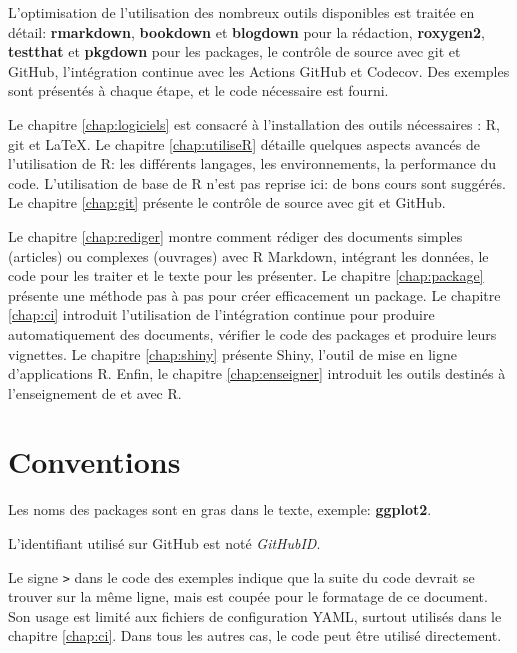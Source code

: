 \documentclass[
  12pt,
  french,
  a4paper,
  extrafontsizes,onecolumn,openright
  ]{memoir}
\newlength{\rf}
\begin{document}
L'optimisation de l'utilisation des nombreux outils disponibles est traitée en détail: \textbf{rmarkdown}, \textbf{bookdown} et \textbf{blogdown} pour la rédaction, \textbf{roxygen2}, \textbf{testthat} et \textbf{pkgdown} pour les packages, le contrôle de source avec git et GitHub, l'intégration continue avec les Actions GitHub et Codecov.
Des exemples sont présentés à chaque étape, et le code nécessaire est fourni.

Le chapitre \ref{chap:logiciels} est consacré à l'installation des outils nécessaires : R, git et LaTeX.
Le chapitre \ref{chap:utiliseR} détaille quelques aspects avancés de l'utilisation de R: les différents langages, les environnements, la performance du code.
L'utilisation de base de R n'est pas reprise ici: de bons cours sont suggérés.
Le chapitre \ref{chap:git} présente le contrôle de source avec git et GitHub.

Le chapitre \ref{chap:rediger} montre comment rédiger des documents simples (articles) ou complexes (ouvrages) avec R Markdown, intégrant les données, le code pour les traiter et le texte pour les présenter.
Le chapitre \ref{chap:package} présente une méthode pas à pas pour créer efficacement un package.
Le chapitre \ref{chap:ci} introduit l'utilisation de l'intégration continue pour produire automatiquement des documents, vérifier le code des packages et produire leurs vignettes.
Le chapitre \ref{chap:shiny} présente Shiny, l'outil de mise en ligne d'applications R.
Enfin, le chapitre \ref{chap:enseigner} introduit les outils destinés à l'enseignement de et avec R.

\hypertarget{conventions}{%
\section*{Conventions}\label{conventions}}

Les noms des packages sont en gras dans le texte, exemple: \textbf{ggplot2}.

L'identifiant utilisé sur GitHub est noté \emph{GitHubID}.

Le signe \texttt{\textbar{}\textgreater{}} dans le code des exemples indique que la suite du code devrait se trouver sur la même ligne, mais est coupée pour le formatage de ce document.
Son usage est limité aux fichiers de configuration YAML, surtout utilisés dans le chapitre \ref{chap:ci}.
Dans tous les autres cas, le code peut être utilisé directement.

\mainmatter
\end{document}

